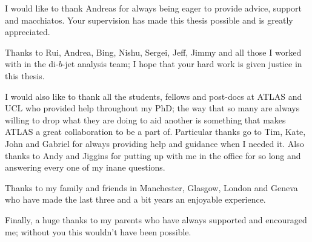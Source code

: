 \begin{acknowledgements}

I would like to thank Andreas for always being eager to provide advice, support and macchiatos.
Your supervision has made this thesis possible and is greatly appreciated.

Thanks to Rui, Andrea, Bing, Nishu, Sergei, Jeff, Jimmy and all those I worked with in the di-$b$-jet analysis team;
I hope that your hard work is given justice in this thesis.

I would also like to thank all the students, fellows and post-docs at ATLAS and UCL who provided help throughout my PhD;
the way that so many are always willing to drop what they are doing to aid another is something that makes ATLAS a great collaboration to be a part of.
Particular thanks go to Tim, Kate, John and Gabriel for always providing help and guidance when I needed it.
Also thanks to Andy and Jiggins for putting up with me in the office for so long and answering every one of my inane questions.

Thanks to my family and friends in Manchester, Glasgow, London and Geneva who have made the last three and a bit years an enjoyable experience.

Finally, a huge thanks to my parents who have always supported and encouraged me;
without you this wouldn't have been possible. 

\end{acknowledgements}

\setcounter{tocdepth}{2} 

\tableofcontents
\listoffigures
\listoftables

